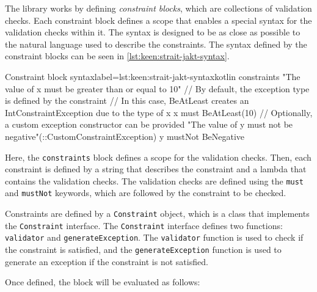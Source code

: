         The library works by defining \textit{constraint blocks}, which are collections of validation checks. Each
        constraint block defines a scope that enables a special syntax for the validation checks within it. The syntax
        is designed to be as close as possible to the natural language used to describe the constraints. The syntax
        defined by the constraint blocks can be seen in \vref{lst:keen:strait-jakt-syntax}.

        \begin{code}{Constraint block syntax}{label={lst:keen:strait-jakt-syntax}}{kotlin}
            constraints {
                "The value of x must be greater than or equal to 10" {
                    // By default, the exception type is defined by the constraint
                    // In this case, BeAtLeast creates an IntConstraintException due to the type of x
                    x must BeAtLeast(10)
                }
                // Optionally, a custom exception constructor can be provided
                "The value of y must not be negative"(::CustomConstraintException) {
                    y mustNot BeNegative
                }
            }
        \end{code}

        Here, the \texttt{constraints} block defines a scope for the validation checks. Then, each constraint is defined
        by a string that describes the constraint and a lambda that contains the validation checks. The validation
        checks are defined using the \texttt{must} and \texttt{mustNot} keywords, which are followed by the constraint
        to be checked.
        
        Constraints are defined by a \texttt{Constraint} object, which is a class that implements the 
        \texttt{Constraint} interface. The \texttt{Constraint} interface defines two functions: \texttt{validator} and
        \texttt{generateException}. The \texttt{validator} function is used to check if the constraint is satisfied,
        and the \texttt{generateException} function is used to generate an exception if the constraint is not
        satisfied.

        Once defined, the block will be evaluated as follows:

